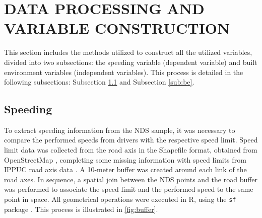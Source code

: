 
\section{DATA PROCESSING AND VARIABLE CONSTRUCTION} \label{data}


This section includes the methods utilized to construct all the utilized variables, divided into two subsections: the speeding variable (dependent variable) and built environment variables (independent variables). This process is detailed in the following subsections: Subsection \ref{sub:spd} and Subsection \ref{sub:be}.


\subsection{Speeding} \label{sub:spd}





To extract speeding information from the NDS sample, it was necessary to compare the performed speeds from drivers with the respective speed limit. Speed limit data was collected from the road axis in the Shapefile format, obtained from OpenStreetMap \cite{OpenStreetMap}, completing some missing information with speed limits from IPPUC road axis data \cite{IPPUC2021}. A 10-meter buffer was created around each link of the road axes. In sequence, a spatial join between the NDS points and the road buffer was performed to associate the speed limit and the performed speed to the same point in space. All geometrical operations were executed in R, using the \verb|sf| package \cite{pebesma2018}. This process is illustrated in \autoref{fig:buffer}. 


